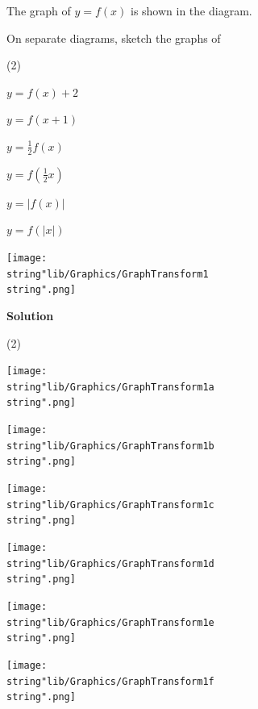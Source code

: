 \documentclass[11pt,a4paper]{book}
\begin{document}
\newpage

\begin{example}{}
The graph of $y=f\left(x\right)$ is shown in the diagram.

\begin{minipage}[t]{0.5\textwidth}

On separate diagrams, sketch the graphs of

\begin{tasks}[label=(\alph*),label-width=3.5ex](2)

\task $y=f\left(x\right)+2$

\task  $y=f\left(x+1\right)$

\task  ${\displaystyle y=\frac{1}{2}f\left(x\right)}$

\task ${\displaystyle y=f\left(\frac{1}{2}x\right)}$

\task  $y=\left|f\left(x\right)\right|$

\task  $y=f\left(\left|x\right|\right)$

\end{tasks}

\end{minipage}
\begin{minipage}[t]{0.5\textwidth}
\begin{center}
\texttt{[image: \\string"lib/Graphics/GraphTransform1\\string".png]}
\par\end{center}

\end{minipage}

\textbf{Solution}

\begin{tasks}[label=(\alph*),label-width=3.5ex](2)

\task  \texttt{[image: \\string"lib/Graphics/GraphTransform1a\\string".png]}

\task  \texttt{[image: \\string"lib/Graphics/GraphTransform1b\\string".png]}

\task \texttt{[image: \\string"lib/Graphics/GraphTransform1c\\string".png]}

\task  \texttt{[image: \\string"lib/Graphics/GraphTransform1d\\string".png]}

\task \texttt{[image: \\string"lib/Graphics/GraphTransform1e\\string".png]}

\task  \texttt{[image: \\string"lib/Graphics/GraphTransform1f\\string".png]}

\end{tasks}

\end{example}
\end{document}
